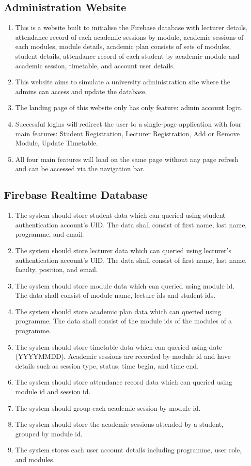 \documentclass[../report.tex]{subfiles}
\begin{document}
\subsection{Administration Website}
\begin{enumerate}
\item This is a website built to initialise the Firebase database with lecturer details, attendance record of each academic sessions by module, academic sessions of each modules, module details, academic plan consists of sets of modules, student details, attendance record of each student by academic module and academic session, timetable, and account user details.
\item This website aims to simulate a university administration site where the admins can access and update the database. 
\item The landing page of this website only has only feature: admin account login. 
\item Successful logins will redirect the user to a single-page application with four main features: Student Registration, Lecturer Registration, Add or Remove Module, Update Timetable.
\item All four main features will load on the same page without any page refresh and can be accessed via the navigation bar.
\end{enumerate}

\subsection{Firebase Realtime Database}
\begin{enumerate}
\item The system should store student data which can queried using student authentication account’s UID. The data shall consist of first name, last name, programme, and email.
\item The system should store lecturer data which can queried using lecturer’s authentication account’s UID. The data shall consist of first name, last name, faculty, position, and email.
\item The system should store module data which can queried using module id. The data shall consist of module name, lecture ids and student ids.
\item The system should store academic plan data which can queried using programme. The data shall consist of the module ids of the modules of a programme.
\item The system should store timetable data which can queried using date (YYYYMMDD). Academic sessions are recorded by module id and have details such as session type, status, time begin, and time end.
\item The system should store attendance record data which can queried using module id and session id. 
\item The system should group each academic session by module id.
\item The system should store the academic sessions attended by a student, grouped by module id.
\item The system stores each user account details including programme, user role, and modules.
\end{enumerate}
\end{document}
